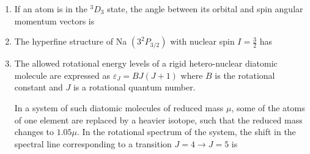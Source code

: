 \documentclass[journal,12pt,onecolumn]{IEEEtran}
\begin{document}
\begin{enumerate}[itemsep = 1em]
\hfill{}
\begin{enumerate}
\end{enumerate}

\item If an atom is in the $^{3}D_{3}$ state, the angle between its orbital and spin angular momentum vectors is

\hfill{}
\begin{enumerate}
\end{enumerate}

\item The hyperfine structure of Na $(3^{2}P_{3/2})$ with nuclear spin $I = \frac{3}{2}$ has

\hfill{}
\begin{enumerate}
\end{enumerate}

\item The allowed rotational energy levels of a rigid hetero-nuclear diatomic molecule are expressed as $\varepsilon_{J} = BJ(J+1)$ where $B$ is the rotational constant and $J$ is a rotational quantum number.

In a system of such diatomic molecules of reduced mass $\mu$, some of the atoms of one element are replaced by a heavier isotope, such that the reduced mass changes to $1.05\mu$. In the rotational spectrum of the system, the shift in the spectral line corresponding to a transition $J=4 \to J=5$ is


\end{enumerate}
\end{document}
